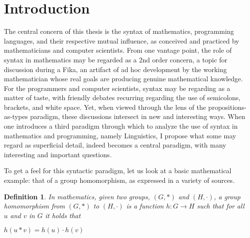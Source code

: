\documentclass[11pt, a4paper]{article}
\newtheorem{definition}{Definition}
\begin{document}
\begin{spacing}{0.0}
\tableofcontents
\end{spacing}

\thispagestyle{empty}

\newpage
\setcounter{page}{1}

\section{Introduction}
\label{sec:intro}

The central concern of this thesis is the syntax of mathematics, programming
languages, and their respective mutual influence, as conceived and practiced by
mathematicians and computer scientists.  From one vantage point, the role of
syntax in mathematics may be regarded as a 2nd order concern, a topic for
discussion during a Fika, an artifact of ad hoc development by the working
mathematician whose real goals are producing genuine mathematical knowledge.
For the programmers and computer scientists, syntax may be regarding as a
matter of taste, with friendly debates recurring regarding the use of
semicolons, brackets, and white space.  Yet, when viewed through the lens of
the propositions-as-types paradigm, these discussions intersect in new and
interesting ways.  When one introduces a third paradigm through which to
analyze the use of syntax in mathematics and programming, namely Linguistics, I
propose what some may regard as superficial detail, indeed becomes a central
paradigm, with many interesting and important questions. 

To get a feel for this syntactic paradigm, let us look at a basic mathematical
example: that of a group homomorphism, as expressed in a variety of sources.  


\begin{definition}
In mathematics, given two groups, $(G, \ast)$ and $(H, \cdot)$, a group homomorphism from $(G, \ast)$ to $(H, \cdot)$ is a function $h : G \to H$ such that for all $u$ and $v$ in $G$ it holds that

\begin{center}
  $h(u \ast v) = h ( u ) \cdot h ( v )$ 
\end{center}
\end{definition}
\end{document}
